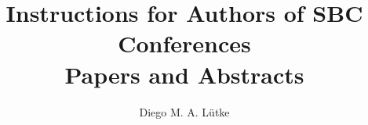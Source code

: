 \title{Instructions for Authors of SBC Conferences\\ Papers and Abstracts}

\author{Diego M. A. Lütke}


\address{Escola Politécnica -- Pontifícia Universidade Católica do Paraná (PUCPR)
}
